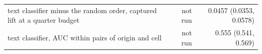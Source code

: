 \begin{tabular}{p{7.4cm}rr}
text classifier minus the random order, captured lift at a quarter budget & not run & 0.0457 (0.0353, 0.0578) \\
text classifier, AUC within pairs of origin and cell & not run & 0.555 (0.541, 0.569) \\
\bottomrule
\end{tabular}
